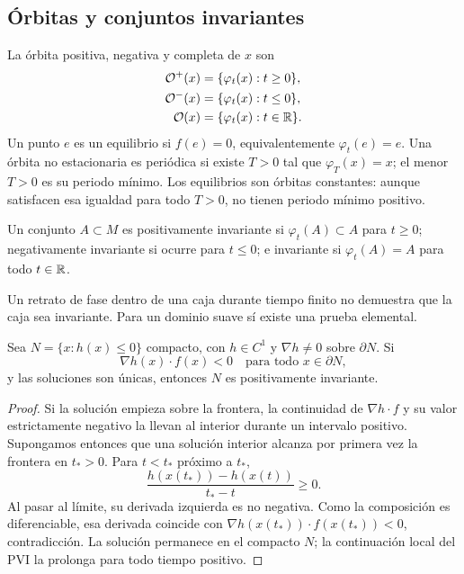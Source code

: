 \subsection{Órbitas y conjuntos invariantes}

\begin{definition}
La órbita positiva, negativa y completa de \(x\) son
\begin{align}
 \mathcal O^+(x)&=\{\varphi_t(x):t\ge0\},\nonumber\\
 \mathcal O^-(x)&=\{\varphi_t(x):t\le0\},\nonumber\\
 \mathcal O(x)&=\{\varphi_t(x):t\in\mathbb{R}\}.
 \label{geo:eq:orbits}
\end{align}
Un punto \(e\) es un equilibrio si \(f(e)=0\), equivalentemente
\(\varphi_t(e)=e\). Una órbita no estacionaria es periódica si existe
\(T>0\) tal que \(\varphi_T(x)=x\); el menor \(T>0\) es su periodo mínimo.
Los equilibrios son órbitas constantes: aunque satisfacen esa igualdad para
todo \(T>0\), no tienen periodo mínimo positivo.
\end{definition}

\begin{definition}[Invariancia]
Un conjunto \(A\subset M\) es positivamente invariante si
\(\varphi_t(A)\subset A\) para \(t\ge0\); negativamente invariante si ocurre
para \(t\le0\); e invariante si \(\varphi_t(A)=A\) para todo \(t\in\mathbb{R}\).
\end{definition}

Un retrato de fase dentro de una caja durante tiempo finito no demuestra que
la caja sea invariante. Para un dominio suave sí existe una prueba elemental.

\begin{proposition}
Sea \(N=\{x:h(x)\le0\}\) compacto, con \(h\in C^1\) y
\(\nabla h\ne0\) sobre \(\partial N\). Si
\begin{equation}
 \nabla h(x)\cdot f(x)<0
 \quad\text{para todo }x\in\partial N,
 \label{geo:eq:strict-inward}
\end{equation}
y las soluciones son únicas, entonces \(N\) es positivamente invariante.
\end{proposition}

\begin{proof}
Si la solución empieza sobre la frontera, la continuidad de
\(\nabla h\cdot f\) y su valor estrictamente negativo la llevan al interior
durante un intervalo positivo. Supongamos entonces que una solución
interior alcanza por primera vez la frontera en \(t_*>0\). Para
\(t<t_*\) próximo a \(t_*\),
\[
 \frac{h(x(t_*))-h(x(t))}{t_*-t}\ge0.
\]
Al pasar al límite, su derivada izquierda es no negativa. Como la
composición es diferenciable, esa derivada coincide con
\(\nabla h(x(t_*))\cdot f(x(t_*))<0\), contradicción.
La solución permanece en el compacto \(N\); la continuación local del PVI
la prolonga para todo tiempo positivo.
\end{proof}

